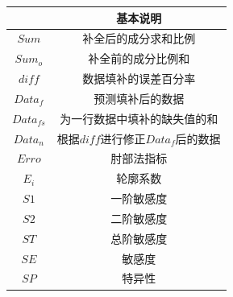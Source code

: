\documentclass[UTF8]{ctexart}
\begin{document}
            \begin{table}[H]
                \begin{center}
                    \begin{tabular}{c|c}
                        \toprule[2pt]
                        \rowcolor[gray]{0.8}

                        \multicolumn{1}{m{8em}}{\centering 符号} & \multicolumn{1}{m{17em}}{\centering 基本说明} \\


                        \midrule[1.3pt]
                        $Sum$                                    & 补全后的成分求和比例                          \\
                        $Sum_o$                                  & 补全前的成分比例和                            \\
                        $diff$                                   & 数据填补的误差百分率                          \\
                        $Data_f$                                 & 预测填补后的数据                              \\
                        $Data_{fs}$                              & 为一行数据中填补的缺失值的和                  \\
                        $Data_n$                                 & 根据$diff$进行修正$Data_f$后的数据            \\
                        $Erro$                                   & 肘部法指标                                    \\
                        $E_i$                                    & 轮廓系数                                      \\
                        $S1$                                     & 一阶敏感度                                    \\
                        $S2$                                     & 二阶敏感度                                    \\
                        $ST$                                     & 总阶敏感度                                    \\
                        $SE$                                     & 敏感度                                        \\
                        $SP$                                     & 特异性                                        \\
                        \bottomrule[2pt]
                    \end{tabular}
                \end{center}
            \end{table}
\end{document}
